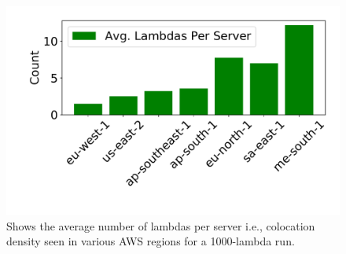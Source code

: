 
\begin{figure}[!t]
  \includegraphics[width=.99\linewidth]{fig/density.pdf}
  \caption{Shows the average number of lambdas per server i.e., colocation 
  density seen in various AWS regions for a 1000-lambda run.
\label{fig:density}}
\end{figure}

